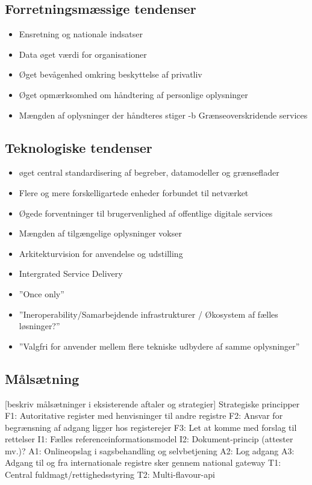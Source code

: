 \subsection{Forretningsmæssige
tendenser}\label{forretningsmuxe6ssige-tendenser}

\begin{itemize}
\tightlist
\item
  Ensretning og nationale indsatser
\item
  Data øget værdi for organisationer
\item
  Øget bevågenhed omkring beskyttelse af privatliv
\item
  Øget opmærksomhed om håndtering af personlige oplysninger
\item
  Mængden af oplysninger der håndteres stiger -b Grænseoverskridende
  services
\end{itemize}

\subsection{Teknologiske tendenser}\label{teknologiske-tendenser}

\begin{itemize}
\tightlist
\item
  øget central standardisering af begreber, datamodeller og grænseflader
\item
  Flere og mere forskelligartede enheder forbundet til netværket
\item
  Øgede forventninger til brugervenlighed af offentlige digitale
  services
\item
  Mængden af tilgængelige oplysninger vokser
\item
  Arkitekturvision for anvendelse og udstilling
\item
  Intergrated Service Delivery
\item
  ''Once only''
\item
  ''Ineroperability/Samarbejdende infrastrukturer / Økosystem af fælles
  løsninger?''
\item
  ''Valgfri for anvender mellem flere tekniske udbydere af samme
  oplysninger''
\end{itemize}

\subsection{Målsætning}\label{muxe5lsuxe6tning}

{[}beskriv målsætninger i eksisterende aftaler og strategier{]}
Strategiske principper F1: Autoritative register med henvisninger til
andre registre F2: Ansvar for begrænsning af adgang ligger hos
registerejer F3: Let at komme med forslag til rettelser I1: Fælles
referenceinformationsmodel I2: Dokument-princip (attester mv.)? A1:
Onlineopslag i sagsbehandling og selvbetjening A2: Log adgang A3: Adgang
til og fra internationale registre sker gennem national gateway T1:
Central fuldmagt/rettighedsstyring T2: Multi-flavour-api

